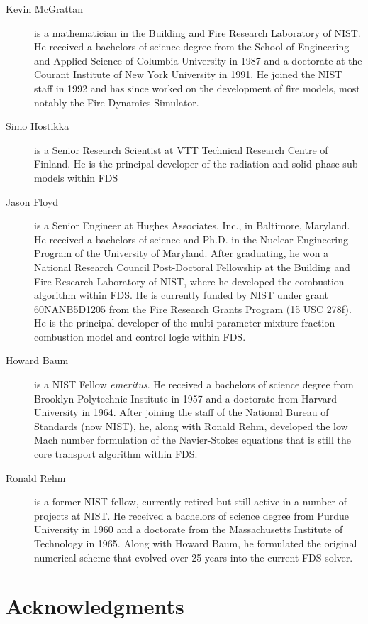 \documentclass[11pt]{book}
\begin{document}
\begin{description}
\item[Kevin McGrattan] is a mathematician in the Building and Fire Research Laboratory of NIST. He received a bachelors of science degree from
the School of Engineering and Applied Science of Columbia University in 1987 and a doctorate at the Courant Institute
of New York University in 1991. He joined the NIST staff in 1992 and has since worked on the development of fire models, most notably the
Fire Dynamics Simulator.
\item[Simo Hostikka] is a Senior Research Scientist at VTT Technical
Research Centre of Finland.  He is the principal developer of the
radiation and solid phase sub-models within FDS
\item[Jason Floyd] is a Senior Engineer at Hughes Associates, Inc., in Baltimore, Maryland. He received a bachelors of science and Ph.D. in the Nuclear Engineering
Program of the University of Maryland. After graduating, he won a National Research Council Post-Doctoral Fellowship at the Building and Fire
Research Laboratory of NIST, where he developed the combustion algorithm within FDS. He is currently funded by NIST under grant 60NANB5D1205 from the Fire Research Grants Program (15 USC 278f).
He is the principal developer of the multi-parameter mixture fraction combustion model and control logic within FDS.
\item[Howard Baum] is a NIST Fellow {\em emeritus}. He received a bachelors of science degree from Brooklyn Polytechnic Institute in 1957 and a
doctorate from Harvard University in 1964. After joining the staff of the National Bureau of Standards (now NIST), he, along with Ronald Rehm,
developed the low Mach number formulation of the Navier-Stokes equations that is still the core transport algorithm within FDS.
\item[Ronald Rehm] is a former NIST fellow, currently retired but still active in a number of projects at NIST. He received a bachelors of science
degree from Purdue University in 1960 and a doctorate from the Massachusetts Institute of Technology in 1965. Along with Howard Baum, he
formulated the original numerical scheme that evolved over 25 years into the current FDS solver.
\end{description}


\chapter{Acknowledgments}
\end{document}
